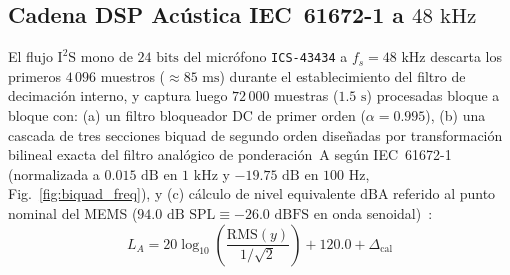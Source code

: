 \documentclass[conference]{IEEEtran}
\begin{document}
\subsection{Cadena DSP Acústica IEC~61672-1 a \texorpdfstring{$48\text{ kHz}$}{48 kHz}}

El flujo $\text{I}^2\text{S}$ mono de $24\text{ bits}$ del micrófono \texttt{ICS-43434} a $f_s = 48\text{ kHz}$ descarta los primeros $4\,096$ muestros ($\approx 85\text{ ms}$) durante el establecimiento del filtro de decimación interno, y captura luego $72\,000$ muestras ($1.5\text{ s}$) procesadas bloque a bloque con: (a) un filtro bloqueador DC de primer orden ($\alpha = 0.995$), (b) una cascada de tres secciones biquad de segundo orden diseñadas por transformación bilineal exacta del filtro analógico de ponderación~A según IEC~61672-1~\cite{iec61672} (normalizada a $0.015\text{ dB}$ en $1\text{ kHz}$ y $-19.75\text{ dB}$ en $100\text{ Hz}$, Fig.~\ref{fig:biquad_freq}), y (c) cálculo de nivel equivalente $\mathrm{dBA}$ referido al punto nominal del MEMS ($94.0\text{ dB SPL} \equiv -26.0\text{ dBFS}$ en onda senoidal)~\cite{invensense2016ics43434}:
\begin{equation}
L_{A} = 20\log_{10}\!\left(\frac{\mathrm{RMS}(y)}{1/\sqrt{2}}\right) + 120.0 + \Delta_{\mathrm{cal}}
\label{eq:dba}
\end{equation}
\end{document}
